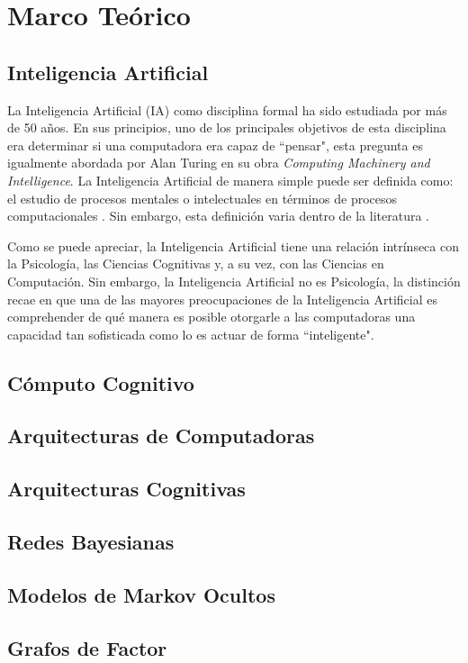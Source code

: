 \chapter{Marco Te\'{o}rico}
\label{ch:marco}
\section{Inteligencia Artificial}
La Inteligencia Artificial (IA) como disciplina formal  ha sido estudiada por más de 50 años. En sus principios, uno de los principales objetivos de esta disciplina era determinar si una computadora era capaz de “pensar", esta pregunta es igualmente abordada por Alan Turing\cite{turing1950computing} en su obra \emph{Computing Machinery and Intelligence}. La Inteligencia Artificial de manera simple puede ser definida como: el estudio de procesos mentales o intelectuales en t\'{e}rminos de procesos computacionales \cite{aimodern}. Sin embargo, esta definici\'{o}n varia dentro de la literatura \cite{haugeland1985,bellman1978,winston1992learning}. 

Como se puede apreciar, la Inteligencia Artificial tiene una relaci\'{o}n intr\'{i}nseca con la Psicolog\'{i}a, las Ciencias Cognitivas y, a su vez, con las Ciencias en Computaci\'{o}n. Sin embargo, la Inteligencia Artificial no es Psicolog\'{i}a, la distinci\'{o}n recae en que una de las mayores preocupaciones de la Inteligencia Artificial es comprehender de qu\'{e} manera es posible otorgarle a las computadoras una capacidad tan sofisticada como lo es actuar de forma “inteligente".
\section{C\'{o}mputo Cognitivo}
\section{Arquitecturas de Computadoras}
\section{Arquitecturas Cognitivas}
\section{Redes Bayesianas}
\section{Modelos de Markov Ocultos}
\section{Grafos de Factor}